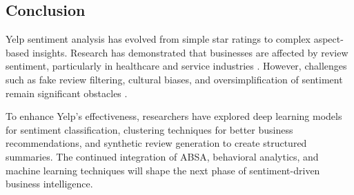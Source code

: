 \documentclass{article}
\begin{document}
\subsection{Conclusion}
Yelp sentiment analysis has evolved from simple star ratings to complex aspect-based insights. Research has demonstrated that businesses are affected by review sentiment, particularly in healthcare and service industries \cite{ChenLee2024}. However, challenges such as fake review filtering, cultural biases, and oversimplification of sentiment remain significant obstacles \cite{Mukherjee2021}. 

To enhance Yelp's effectiveness, researchers have explored deep learning models for sentiment classification, clustering techniques for better business recommendations, and synthetic review generation to create structured summaries. The continued integration of ABSA, behavioral analytics, and machine learning techniques will shape the next phase of sentiment-driven business intelligence.



\end{document}
